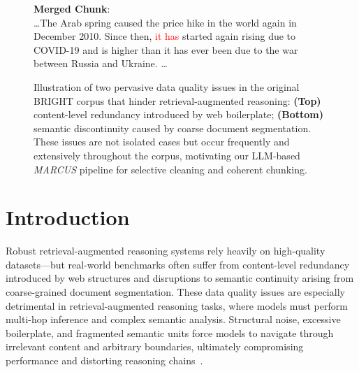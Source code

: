 \documentclass[11pt]{article}
\newcommand{\mymethod}{\emph{MARCUS}}
\begin{document}
\begin{figure}[t]
\begin{tcolorbox}
    
    \vspace{6pt}
    
        \begin{tcolorbox}[
            colback=green!5,
            colframe=green!50!black,
            boxrule=0.5pt,
            arc=1pt,
            left=4pt,
            right=4pt,
            top=4pt,
            bottom=4pt,
            enhanced,
            width=\textwidth
        ]
        {\color[RGB]{71,162,26}\textbf{Merged Chunk}}: \\
        \ldots The Arab spring caused the price hike in the world again in December 2010. Since then, \textcolor{red}{it has} started again rising due to COVID-19 and is higher than it has ever been due to the war between Russia and Ukraine. \ldots
        \end{tcolorbox}
    
    \end{tcolorbox}

    \caption{
    Illustration of two pervasive data quality issues in the original BRIGHT corpus that hinder retrieval-augmented reasoning: \textbf{(Top)} content-level redundancy introduced by web boilerplate; \textbf{(Bottom)} semantic discontinuity caused by coarse document segmentation. 
    These issues are not isolated cases but occur frequently and extensively throughout the corpus, motivating our LLM-based \mymethod{} pipeline for selective cleaning and coherent chunking.}

    \label{fig:bright-cases}
\end{figure}


\section{Introduction}

Robust retrieval-augmented reasoning systems rely heavily on high-quality datasets—but real-world benchmarks often suffer from content-level redundancy introduced by web structures and disruptions to semantic continuity arising from coarse-grained document segmentation. These data quality issues are especially detrimental in retrieval-augmented reasoning tasks, where models must perform multi-hop inference and complex semantic analysis. Structural noise, excessive boilerplate, and fragmented semantic units force models to navigate through irrelevant content and arbitrary boundaries, ultimately compromising performance and distorting reasoning chains~\citep{jiang2020data, jiang2022closer}.
\end{document}

